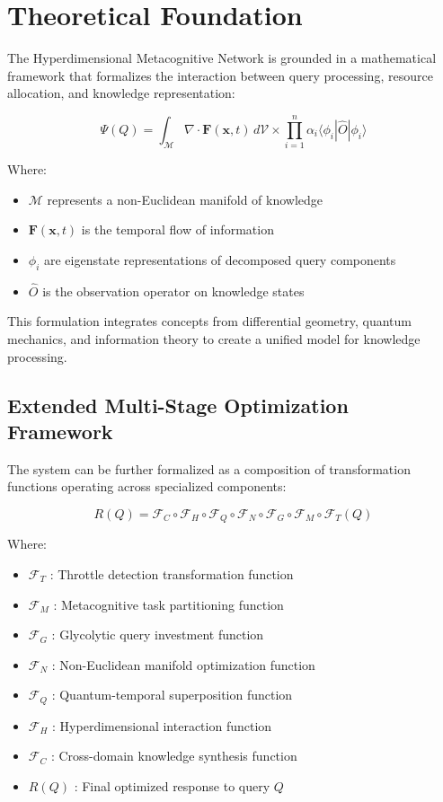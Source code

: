 \documentclass[journal,onecolumn]{IEEEtran}
\begin{document}
\section{Theoretical Foundation}

The Hyperdimensional Metacognitive Network is grounded in a mathematical framework that formalizes the interaction between query processing, resource allocation, and knowledge representation:

\begin{equation}
\Psi(Q) = \int_{\mathcal{M}} \nabla \cdot \mathbf{F}(\mathbf{x}, t) \, d\mathcal{V} \times \prod_{i=1}^{n} \alpha_i \langle \phi_i | \hat{O} | \phi_i \rangle
\end{equation}

Where:
\begin{itemize}
\item $\mathcal{M}$ represents a non-Euclidean manifold of knowledge
\item $\mathbf{F}(\mathbf{x}, t)$ is the temporal flow of information
\item $\phi_i$ are eigenstate representations of decomposed query components
\item $\hat{O}$ is the observation operator on knowledge states
\end{itemize}

This formulation integrates concepts from differential geometry, quantum mechanics, and information theory to create a unified model for knowledge processing.

\subsection{Extended Multi-Stage Optimization Framework}

The system can be further formalized as a composition of transformation functions operating across specialized components:

\begin{equation}
R(Q) = \mathcal{F}_C \circ \mathcal{F}_H \circ \mathcal{F}_Q \circ \mathcal{F}_N \circ \mathcal{F}_G \circ \mathcal{F}_M \circ \mathcal{F}_T(Q)
\end{equation}

Where:
\begin{itemize}
\item $\mathcal{F}_T$ : Throttle detection transformation function
\item $\mathcal{F}_M$ : Metacognitive task partitioning function
\item $\mathcal{F}_G$ : Glycolytic query investment function
\item $\mathcal{F}_N$ : Non-Euclidean manifold optimization function
\item $\mathcal{F}_Q$ : Quantum-temporal superposition function
\item $\mathcal{F}_H$ : Hyperdimensional interaction function
\item $\mathcal{F}_C$ : Cross-domain knowledge synthesis function
\item $R(Q)$ : Final optimized response to query $Q$
\end{itemize}
\end{document}
